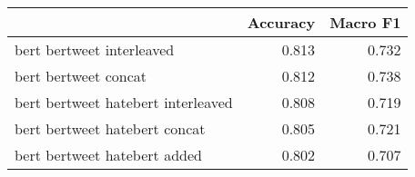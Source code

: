 \begin{tabular}{lrr}
\toprule
{} &  Accuracy &  Macro F1 \\
\midrule
bert bertweet interleaved           &     0.813 &     0.732 \\
bert bertweet concat                &     0.812 &     0.738 \\
bert bertweet hatebert interleaved  &     0.808 &     0.719 \\
bert bertweet hatebert concat       &     0.805 &     0.721 \\
bert bertweet hatebert added        &     0.802 &     0.707 \\
\bottomrule
\end{tabular}

